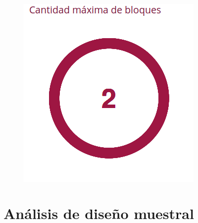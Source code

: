 \documentclass[10,a4paperpaper,]{article}
\begin{document}
\begin{figure}[!htb]
\begin{minipage}{0.3\textwidth}
  \end{minipage}
  \begin{minipage}{0.3\textwidth}
    \centering
    \includegraphics[width=1.0\linewidth]{figures/tres.png}
  \end{minipage}
\end{figure}

\newpage

\section{Análisis de diseño muestral}
\end{document}
